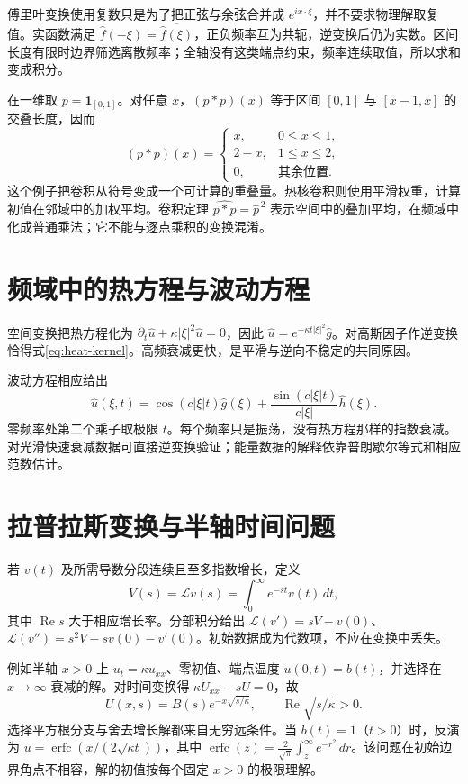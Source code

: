 \documentclass[UTF8,12pt,a4paper,fontset=fandol]{ctexbook}
\begin{document}
傅里叶变换使用复数只是为了把正弦与余弦合并成 $e^{ix\cdot\xi}$，并不要求物理解取复值。实函数满足 $\widehat f(-\xi)=\overline{\widehat f(\xi)}$，正负频率互为共轭，逆变换后仍为实数。区间长度有限时边界筛选离散频率；全轴没有这类端点约束，频率连续取值，所以求和变成积分。

\begin{example}[卷积如何叠加平移响应]
在一维取 $p=\mathbf1_{[0,1]}$。对任意 $x$，$(p*p)(x)$ 等于区间 $[0,1]$ 与 $[x-1,x]$ 的交叠长度，因而
\[
 (p*p)(x)=\begin{cases}
 x,&0\le x\le1,\\ 2-x,&1\le x\le2,\\0,&\text{其余位置}.
 \end{cases}
\]
这个例子把卷积从符号变成一个可计算的重叠量。热核卷积则使用平滑权重，计算初值在邻域中的加权平均。卷积定理 $\widehat{p*p}=\widehat p^{\,2}$ 表示空间中的叠加平均，在频域中化成普通乘法；它不能与逐点乘积的变换混淆。
\end{example}

\section{频域中的热方程与波动方程}
空间变换把热方程化为 $\partial_t\widehat u+\kappa|\xi|^2\widehat u=0$，因此 $\widehat u=e^{-\kappa t|\xi|^2}\widehat g$。对高斯因子作逆变换恰得式\eqref{eq:heat-kernel}。高频衰减更快，是平滑与逆向不稳定的共同原因。

波动方程相应给出
\begin{equation}
 \widehat u(\xi,t)=\cos(c|\xi|t)\widehat g(\xi)
 +\frac{\sin(c|\xi|t)}{c|\xi|}\widehat h(\xi).
 \label{eq:wave-fourier}
\end{equation}
零频率处第二个乘子取极限 $t$。每个频率只是振荡，没有热方程那样的指数衰减。对光滑快速衰减数据可直接逆变换验证；能量数据的解释依靠普朗歇尔等式和相应范数估计。

\section{拉普拉斯变换与半轴时间问题}
若 $v(t)$ 及所需导数分段连续且至多指数增长，定义
\[
 V(s)=\mathcal Lv(s)=\int_0^\infty e^{-st}v(t)\,dt,
\]
其中 $\operatorname{Re}s$ 大于相应增长率。分部积分给出 $\mathcal L(v')=sV-v(0)$、$\mathcal L(v'')=s^2V-sv(0)-v'(0)$。初始数据成为代数项，不应在变换中丢失。

例如半轴 $x>0$ 上 $u_t=\kappa u_{xx}$、零初值、端点温度 $u(0,t)=b(t)$，并选择在 $x\to\infty$ 衰减的解。对时间变换得 $\kappa U_{xx}-sU=0$，故
\[
 U(x,s)=B(s)e^{-x\sqrt{s/\kappa}},\qquad \operatorname{Re}\sqrt{s/\kappa}>0.
\]
选择平方根分支与舍去增长解都来自无穷远条件。当 $b(t)=1$（$t>0$）时，反演为 $u=\operatorname{erfc}(x/(2\sqrt{\kappa t}))$，其中 $\operatorname{erfc}(z)=\frac2{\sqrt\pi}\int_z^\infty e^{-r^2}\,dr$。该问题在初始边界角点不相容，解的初值按每个固定 $x>0$ 的极限理解。
\end{document}
